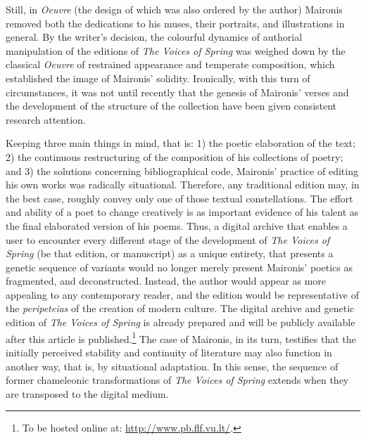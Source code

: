\begin{paper}
Still, in \emph{Oeuvre} (the design of which was also ordered by the author)
Maironis removed both the dedications to his muses, their portraits, and
illustrations in general. By the writer's decision, the colourful
dynamics of authorial manipulation of the editions of \emph{The Voices
of Spring} was weighed down by the classical \emph{Oeuvre} of restrained
appearance and temperate composition, which established the image of
Maironis' solidity. Ironically, with this turn of circumstances, it was
not until recently that the genesis of Maironis' verses and the
development of the structure of the collection have been given
consistent research attention.

Keeping three main things in mind, that is: 1) the poetic elaboration of the text; 2) the
continuous restructuring of the composition of his collections of poetry; and 3) the solutions
concerning bibliographical code,  Maironis' practice of editing his own works was radically
situational. Therefore, any traditional edition may, in the best case,
roughly convey only one of those textual constellations. The effort and
ability of a poet to change creatively is as important evidence of his
talent as the final elaborated version of his poems. Thus, a digital
archive that enables a user to encounter every different stage of the
development of \emph{The Voices of Spring} (be that edition, or manuscript) as a
unique entirety, that presents a genetic sequence of variants would no longer merely present Maironis' poetics as fragmented, and deconstructed. Instead, the author would appear as more
appealing to any contemporary reader, and the edition would be representative of
the \emph{peripeteias} of the creation of modern culture. The digital archive and genetic edition of \emph{The
Voices of Spring} is already prepared and will be publicly available
after this article is published.\footnote{To be hosted online at:
  \url{http://www.pb.flf.vu.lt/}.} The case of Maironis, in its turn,
testifies that the initially perceived stability and continuity of literature may also function in another way, that
is, by situational adaptation. In this sense, the sequence of former chameleonic
transformations of \emph{The Voices of Spring} extends when they are transposed
to the digital medium.

\begin{flushleft}
  
\end{flushleft}

\end{paper}